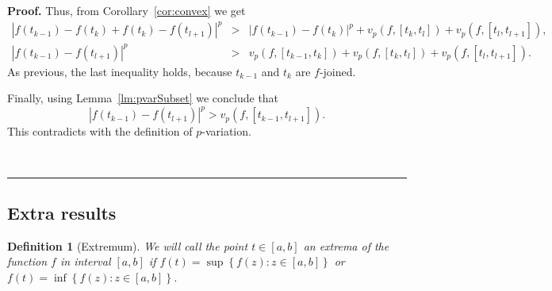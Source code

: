 \documentclass[12pt, a4paper]{article}
\newtheorem{definition}[theorem]{Definition}
\newenvironment{proof}[1][Proof]{\noindent \textbf{#1.} }{\  \rule{0.5em}{0.5em}}
\numberwithin{equation}{section}
\begin{document}
\begin{proof}
  Thus, from Corollary~\ref{cor:convex} we get
  \begin{eqnarray*}
    |f(t_{k-1})-f(t_k)+f(t_k)-f(t_{l+1})|^p&>&
      |f(t_{k-1})-f(t_{k})|^p+v_p(f,[t_k,t_l])+v_p(f,[t_l,t_{l+1}]), \\
    |f(t_{k-1})-f(t_{l+1})|^p &>& v_p(f,[t_{k-1},t_{k}]) 
      + v_p(f,[t_k,t_l])+v_p(f,[t_l,t_{l+1}]).
  \end{eqnarray*}  
  As previous, the last inequality holds, 
  because $t_{k-1}$ and $t_{k}$ are
  $f$-joined.

  Finally, using Lemma~\ref{lm:pvarSubset} we conclude that
  $$|f(t_{k-1})-f(t_{l+1})|^p > v_p(f,[t_{k-1},t_{l+1}]).$$
  This contradicts with the definition of $p$-variation.    
  
  
\end{proof}

\subsection{Extra results}


\begin{definition}[Extremum]\label{def:extremum}
  We will call the point $t \in  [a,b]$ an \emph{extrema}
  of the function $f$ in interval $[a,b]$ if   
  $f(t)=\sup \left\{ f(z):z\in \left[ a,b\right]
  \right\} $ or 
  $f(t)=\inf \left\{ f(z):z\in \left[ a,b\right] \right\} $.
\end{definition}
\end{document}
